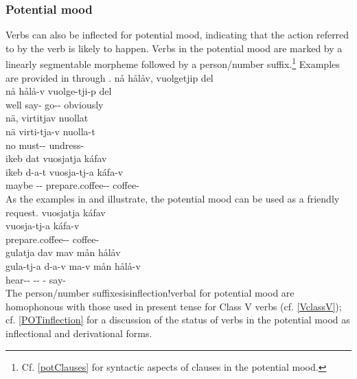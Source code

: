 \subsubsection{Potential mood}\label{POTmood}
Verbs can also be inflected for potential mood, indicating that the action referred to by the verb is likely to happen. Verbs in the potential mood are marked by a linearly segmentable morpheme  followed by a person/number suffix.\footnote{Cf. \SEC\ref{potClauses} for syntactic aspects of clauses in the potential mood.} 
Examples are provided in  through .
\ea\label{potentialEx1}
\glll	nå hålåv, vuolgetjip del\\
	nå hålå-v vuolge-tji-p del\\
	well say- go-- obviously\\\nopagebreak
{}	
\z
\ea\label{potentialEx2}
\glll	nä, virtitjav nuollat\\
	nä virti-tja-v nuolla-t\\
	no must-- undress-\\\nopagebreak
{}	
\z
\ea\label{potentialEx3}
\glll	ikeb dat vuosjatja káfav\\
	ikeb d-a-t vuosja-tj-a káfa-v\\
	maybe -- prepare.coffee-- coffee-\\\nopagebreak
{}	
\z
As the examples in  and  illustrate, the potential mood can be used as a friendly request. 
\ea\label{potentialEx4}%
\glll	vuosjatja káfav\\
	vuosja-tj-a káfa-v\\
	prepare.coffee-- coffee-\\\nopagebreak
{}	
\z
\ea\label{potentialEx5}%
\glll	gulatja dav mav mån hålåv\\
	gula-tj-a d-a-v ma-v mån hålå-v\\
	hear-- -- -  say-\\\nopagebreak
{}	
\z
The person/number suffixesis{inflection!verbal} for potential mood are homophonous %
with those used in present tense for Class V verbs (cf. \SEC\ref{VclassV}); cf. \SEC\ref{POTinflection} for a discussion of the status of verbs in the potential mood as inflectional and derivational forms. 


